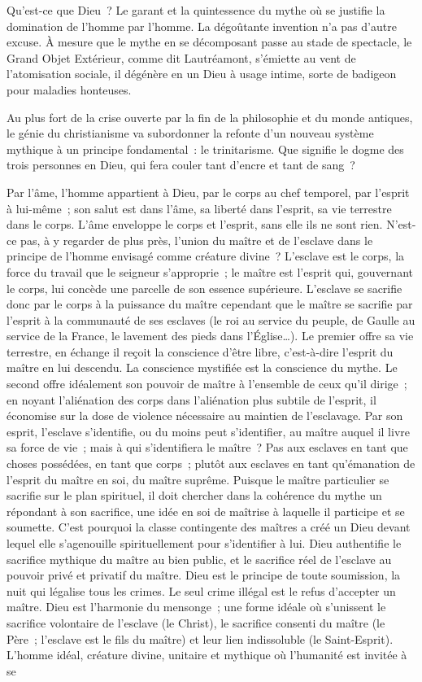 \documentclass[french,twoside]{book} %
\begin{document}
\noindent Qu’est-ce que Dieu ? Le garant et la quintessence du mythe où se justifie la domination de l’homme par l’homme. La dégoûtante invention n’a pas d’autre excuse. À mesure que le mythe en se décomposant passe au stade de spectacle, le Grand Objet Extérieur, comme dit Lautréamont, s’émiette au vent de l’atomisation sociale, il dégénère en un Dieu à usage intime, sorte de badigeon pour maladies honteuses.\par
Au plus fort de la crise ouverte par la fin de la philosophie et du monde antiques, le génie du christianisme va subordonner la refonte d’un nouveau système mythique à un principe fondamental : le trinitarisme. Que signifie le dogme des trois personnes en Dieu, qui fera couler tant d’encre et tant de sang ?\par
Par l’âme, l’homme appartient à Dieu, par le corps au chef temporel, par l’esprit à lui-même ; son salut est dans l’âme, sa liberté dans l’esprit, sa vie terrestre dans le corps. L’âme enveloppe le corps et l’esprit, sans elle ils ne sont rien. N’est-ce pas, à y regarder de plus près, l’union du maître et de l’esclave dans le principe de l’homme envisagé comme créature divine ? L’esclave est le corps, la force du travail que le seigneur s’approprie ; le maître est l’esprit qui, gouvernant le corps, lui concède une parcelle de son essence supérieure. L’esclave se sacrifie donc par le corps à la puissance du maître cependant que le maître se sacrifie par l’esprit à la communauté de ses esclaves (le roi au service du peuple, de Gaulle au service de la France, le lavement des pieds dans l’Église…). Le premier offre sa vie terrestre, en échange il reçoit la conscience d’être libre, c’est-à-dire l’esprit du maître en lui descendu. La conscience mystifiée est la conscience du mythe. Le second offre idéalement son pouvoir de maître à l’ensemble de ceux qu’il dirige ; en noyant l’aliénation des corps dans l’aliénation plus subtile de l’esprit, il économise sur la dose de violence nécessaire au maintien de l’esclavage. Par son esprit, l’esclave s’identifie, ou du moins peut s’identifier, au maître auquel il livre sa force de vie ; mais à qui s’identifiera le maître ? Pas aux esclaves en tant que choses possédées, en tant que corps ; plutôt aux esclaves en tant qu’émanation de l’esprit du maître en soi, du maître suprême. Puisque le maître particulier se sacrifie sur le plan spirituel, il doit chercher dans la cohérence du mythe un répondant à son sacrifice, une idée en soi de maîtrise à laquelle il participe et se soumette. C’est pourquoi la classe contingente des maîtres a créé un Dieu devant lequel elle s’agenouille spirituellement pour s’identifier à lui. Dieu authentifie le sacrifice mythique du maître au bien public, et le sacrifice réel de l’esclave au pouvoir privé et privatif du maître. Dieu est le principe de toute soumission, la nuit qui légalise tous les crimes. Le seul crime illégal est le refus d’accepter un maître. Dieu est l’harmonie du mensonge ; une forme idéale où s’unissent le sacrifice volontaire de l’esclave (le Christ), le sacrifice consenti du maître (le Père ; l’esclave est le fils du maître) et leur lien indissoluble (le Saint-Esprit). L’homme idéal, créature divine, unitaire et mythique où l’humanité est invitée à se 
\end{document}
